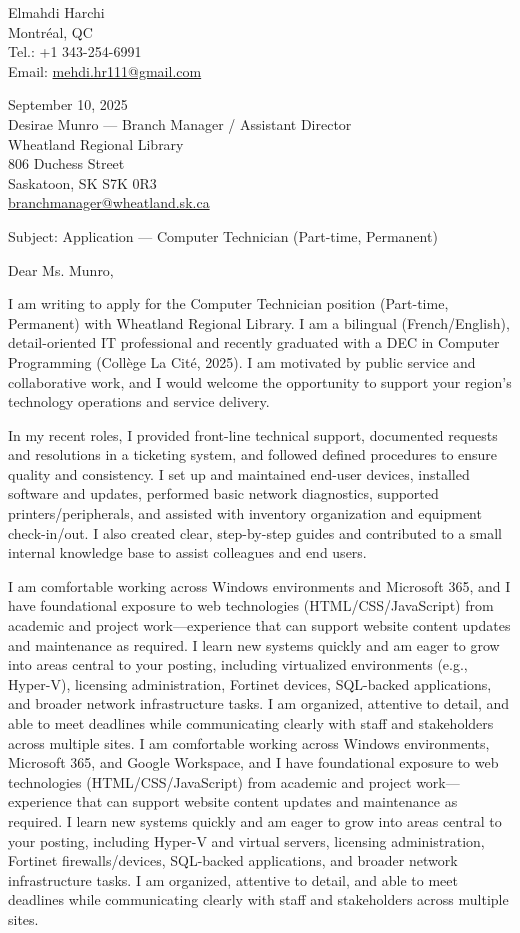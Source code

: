 \documentclass[letterpaper,11pt]{article}
\begin{document}
Elmahdi Harchi\\
Montr\'eal, QC\\
Tel.: +1 343-254-6991\\
Email: \href{mailto:mehdi.hr111@gmail.com}{mehdi.hr111@gmail.com}

September 10, 2025\\

Desirae Munro — Branch Manager / Assistant Director\\
Wheatland Regional Library\\
806 Duchess Street\\
Saskatoon, SK  S7K 0R3\\
\href{mailto:branchmanager@wheatland.sk.ca}{branchmanager@wheatland.sk.ca}

Subject: Application — Computer Technician (Part-time, Permanent)

Dear Ms. Munro,

I am writing to apply for the Computer Technician position (Part-time, Permanent) with Wheatland Regional Library. I am a bilingual (French/English), detail-oriented IT professional and recently graduated with a DEC in Computer Programming (Coll\`ege La Cit\'e, 2025). I am motivated by public service and collaborative work, and I would welcome the opportunity to support your region’s technology operations and service delivery.

In my recent roles, I provided front-line technical support, documented requests and resolutions in a ticketing system, and followed defined procedures to ensure quality and consistency. I set up and maintained end-user devices, installed software and updates, performed basic network diagnostics, supported printers/peripherals, and assisted with inventory organization and equipment check-in/out. I also created clear, step-by-step guides and contributed to a small internal knowledge base to assist colleagues and end users.

I am comfortable working across Windows environments and Microsoft 365, and I have foundational exposure to web technologies (HTML/CSS/JavaScript) from academic and project work—experience that can support website content updates and maintenance as required. I learn new systems quickly and am eager to grow into areas central to your posting, including virtualized environments (e.g., Hyper-V), licensing administration, Fortinet devices, SQL-backed applications, and broader network infrastructure tasks. I am organized, attentive to detail, and able to meet deadlines while communicating clearly with staff and stakeholders across multiple sites.
I am comfortable working across Windows environments, Microsoft 365, and Google Workspace, and I have foundational exposure to web technologies (HTML/CSS/JavaScript) from academic and project work—experience that can support website content updates and maintenance as required. I learn new systems quickly and am eager to grow into areas central to your posting, including Hyper-V and virtual servers, licensing administration, Fortinet firewalls/devices, SQL-backed applications, and broader network infrastructure tasks. I am organized, attentive to detail, and able to meet deadlines while communicating clearly with staff and stakeholders across multiple sites.
\end{document}
